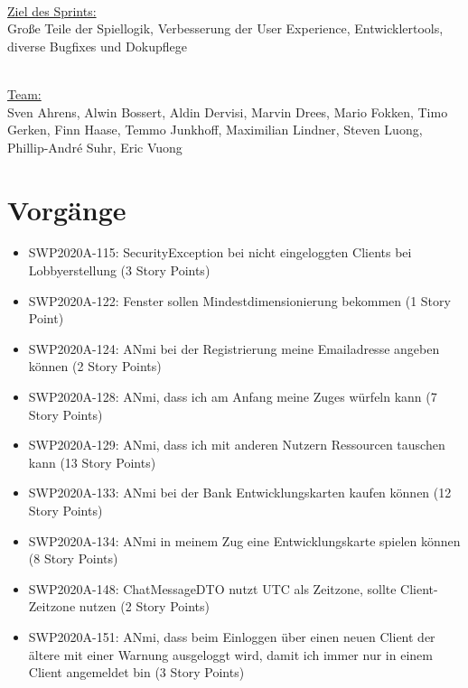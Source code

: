 \documentclass[12pt,a4paper, oneside]{article}
\begin{document}
\noindent 
\\
\underline{Ziel des Sprints:} 
\\
Große Teile der Spiellogik, Verbesserung der User Experience, Entwicklertools, diverse Bugfixes und Dokupflege


\noindent
\\
\underline {Team:} 
\\
Sven Ahrens, Alwin Bossert, Aldin Dervisi, Marvin Drees, Mario Fokken,
Timo Gerken, Finn Haase, Temmo Junkhoff, Maximilian Lindner, Steven Luong, Phillip-André Suhr, Eric Vuong


\section{Vorgänge}

\begin{itemize}

\item SWP2020A-115: SecurityException bei nicht eingeloggten Clients bei Lobbyerstellung (3 Story Points)

\item SWP2020A-122: Fenster sollen Mindestdimensionierung bekommen (1 Story Point)

\item SWP2020A-124: ANmi bei der Registrierung meine Emailadresse angeben können (2 Story Points)

\item SWP2020A-128: ANmi, dass ich am Anfang meine Zuges würfeln kann (7 Story Points)

\item SWP2020A-129: ANmi, dass ich mit anderen Nutzern Ressourcen tauschen kann (13 Story Points)

\item SWP2020A-133: ANmi bei der Bank Entwicklungskarten kaufen können (12 Story Points)

\item SWP2020A-134: ANmi in meinem Zug eine Entwicklungskarte spielen können (8 Story Points)

\item SWP2020A-148: ChatMessageDTO nutzt UTC als Zeitzone, sollte Client-Zeitzone nutzen (2 Story Points)

\item SWP2020A-151: ANmi, dass beim Einloggen über einen neuen Client der ältere mit einer Warnung ausgeloggt wird, damit ich immer nur in einem Client angemeldet bin (3 Story Points)


\end{itemize}
\end{document}
